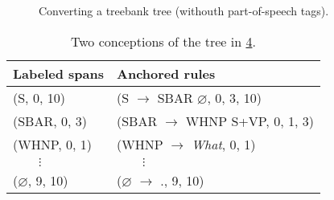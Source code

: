 \begin{figure}

  \begin{subfigure}[b]{\textwidth}
    \center
    \begin{tikzpicture}[scale=.6]
      
    \end{tikzpicture}
		\label{fig:tree-original}
  \end{subfigure}

  \begin{subfigure}[b]{\textwidth}
    \center
    \begin{tikzpicture}[scale=.6]
		  
    \end{tikzpicture}
    \tiny
		\label{fig:tree-simplified}
  \end{subfigure}

  \begin{subfigure}[b]{\textwidth}
    \center
    \begin{tikzpicture}[scale=.6]
		  
    \end{tikzpicture}
    \tiny
		\label{fig:tree-cnf}
  \end{subfigure}

  \begin{subfigure}[b]{\textwidth}
    \center
    \begin{tikzpicture}[scale=.6]
		  
    \end{tikzpicture}
    \tiny
		\label{fig:tree-cnf-spans}
  \end{subfigure}

\caption{Converting a treebank tree (withouth part-of-speech tags).}
\label{fig:trees-ptb}
\end{figure}


\begin{table}[h]
  \center
  \small
  \bgroup  %
  \def\arraystretch{1.5}  %
  \begin{tabular}{l|l}
    Labeled spans & Anchored rules \\
    \hline
    (S, 0, 10)     & (S $\to$ SBAR $\varnothing$, 0, 3, 10)  \\
    (SBAR, 0, 3)   & (SBAR $\to$ WHNP S+VP, 0, 1, 3)  \\
    (WHNP, 0, 1)     & (WHNP $\to$ \textit{What}, 0, 1)  \\
    $\qquad\vdots$ & $\qquad\vdots$  \\
    ($\varnothing$, 9, 10)     & ($\varnothing$ $\to$ ., 9, 10)  \\
  \end{tabular}
  \caption{Two conceptions of the tree in \ref{fig:tree-cnf-spans}.}
  \label{tab:spans-rules}
  \egroup  %
\end{table}


